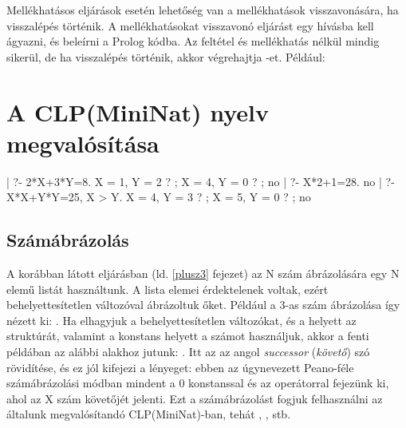 
Mellékhatásos eljárások esetén lehetőség van a mellékhatások visszavonására,
ha visszalépés történik. A mellékhatásokat visszavonó eljárást egy 
hívásba kell ágyazni, és beleírni a Prolog kódba. Az  feltétel
és mellékhatás nélkül mindig sikerül, de ha visszalépés történik, akkor
végrehajtja -et. Például:


\section{A CLP(MiniNat) nyelv megvalósítása}

\begin{prologcode}
| ?- {2*X+3*Y=8}.
X = 1, Y = 2 ? ; 
X = 4, Y = 0 ? ;
no
| ?- {X*2+1=28}.
no
| ?- {X*X+Y*Y=25, X > Y}.
X = 4, Y = 3 ? ; 
X = 5, Y = 0 ? ;
no
\end{prologcode}

\subsection{Számábrázolás}

A korábban látott  eljárásban (ld. \ref{plusz3} fejezet) az
N szám ábrázolására egy N elemű listát használtunk. A lista elemei érdektelenek
voltak, ezért behelyettesítetlen változóval ábrázoltuk őket. Például a 
3-as szám ábrázolása így nézett ki: .
Ha elhagyjuk a behelyettesítetlen változókat, és a  helyett az
 struktúrát, valamint a \cd{[]} konstans helyett a  számot
használjuk, akkor a fenti példában az alábbi alakhoz jutunk: .
Itt az  az angol \emph{successor} (\emph{követő}) szó rövidítése,
és ez jól kifejezi a lényeget: ebben az úgynevezett Peano-féle számábrázolási
módban mindent a 0 konstanssal és az  operátorral fejezünk ki, ahol
 az X szám követőjét jelenti. Ezt a számábrázolást fogjuk felhasználni
az általunk megvalósítandó CLP(MiniNat)-ban, tehát , ,
 stb.

